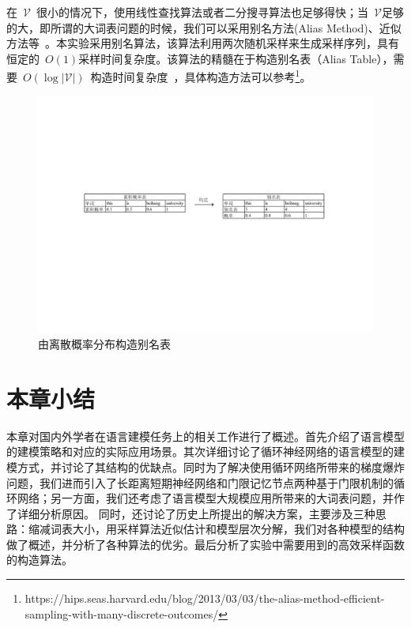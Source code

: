 在~$\mathcal{V}$~很小的情况下，使用线性查找算法或者二分搜寻算法也足够得快；当~$\mathcal{V}$足够的大，即所谓的大词表问题的时候，我们可以采用别名方法(Alias Method)、近似方法等~。本实验采用别名算法，该算法利用两次随机采样来生成采样序列，具有恒定的~$O(1)$采样时间复杂度。该算法的精髓在于构造别名表（Alias Table），需要~$O(\log |\mathcal{V}|)$~构造时间复杂度~，具体构造方法可以参考\footnote{https://hips.seas.harvard.edu/blog/2013/03/03/the-alias-method-efficient-sampling-with-many-discrete-outcomes/}。

\begin{figure}[!t]
  \centering
\includegraphics[width=1\linewidth]{./figures/alias.pdf}
\caption{由离散概率分布构造别名表}\label{fig:alias}
\end{figure}


\section{本章小结}
本章对国内外学者在语言建模任务上的相关工作进行了概述。首先介绍了语言模型的建模策略和对应的实际应用场景。其次详细讨论了循环神经网络的语言模型的建模方式，并讨论了其结构的优缺点。同时为了解决使用循环网络所带来的梯度爆炸问题，我们进而引入了长距离短期神经网络和门限记忆节点两种基于门限机制的循环网络；另一方面，我们还考虑了语言模型大规模应用所带来的大词表问题，并作了详细分析原因。
同时，还讨论了历史上所提出的解决方案，主要涉及三种思路：缩减词表大小，用采样算法近似估计和模型层次分解，我们对各种模型的结构做了概述，并分析了各种算法的优劣。最后分析了实验中需要用到的高效采样函数的构造算法。
